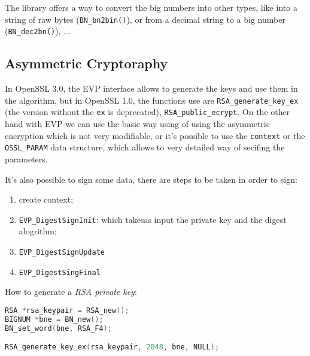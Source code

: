 \documentclass[12pt]{article}
\begin{document}
The library offers a way to convert the big numbers into other types, like into a string of raw bytes (\texttt{BN_bn2bin()}), or from a decimal string to a big number (\texttt{BN_dec2bn()}), ...


\subsection{Asymmetric Cryptoraphy}
In OpenSSL 3.0, the EVP interface allows to generate the keys and use them in the algorithm, but in OpenSSL 1.0, the functions use are \verb|RSA_generate_key_ex| (the version without the \texttt{ex} is deprecated), \texttt{RSA\_public\_ecrypt}. On the other hand with EVP we can use the basic way using of using the asymmetric encryption which is not very modifiable, or it's possible to use the \texttt{context} or the \texttt{OSSL\_PARAM} data structure, which allows to very detailed way of secifing the parameters.

It's also possible to sign some data, there are steps to be taken in order to sign:
\begin{enumerate}
  \item create context;
  \item \texttt{EVP\_DigestSignInit}: which takesas input the private key and the digest alogrithm;
  \item \texttt{EVP\_DigestSignUpdate}
  \item \texttt{EVP\_DigestSingFinal}
\end{enumerate}

How to generate a \emph{RSA private key}:
\begin{lstlisting}[language=c]
RSA *rsa_keypair = RSA_new();
BIGNUM *bne = BN_new();
BN_set_word(bne, RSA_F4);

RSA_generate_key_ex(rsa_keypair, 2048, bne, NULL);
\end{lstlisting}
\end{document}
